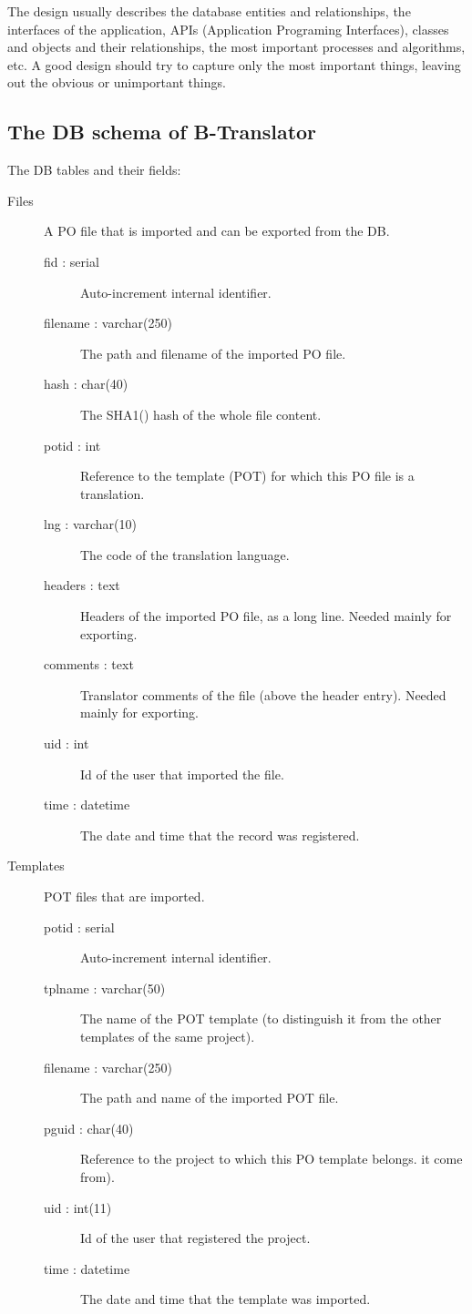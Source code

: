 \documentclass[11pt]{article}
\begin{document}
  The design usually describes the database entities and
  relationships, the interfaces of the application, APIs (Application
  Programing Interfaces), classes and objects and their relationships,
  the most important processes and algorithms, etc. A good design
  should try to capture only the most important things, leaving out
  the obvious or unimportant things.

\subsection{The DB schema of B-Translator}
\label{sec-5.1}


   The DB tables and their fields:

\begin{description}
\item [Files] A PO file that is imported and can be exported from the
              DB.

\begin{description}
\item [fid : serial] Auto-increment internal identifier.
\item [filename : varchar(250)] The path and filename of the
          imported PO file.
\item [hash : char(40)] The SHA1() hash of the whole file content.
\item [potid : int] Reference to the template (POT) for which this
          PO file is a translation.
\item [lng : varchar(10)] The code of the translation language.
\item [headers : text] Headers of the imported PO file, as a long
          line. Needed mainly for exporting.
\item [comments : text] Translator comments of the file (above the
          header entry). Needed mainly for exporting.
\item [uid : int] Id of the user that imported the file.
\item [time : datetime] The date and time that the record was
          registered.
\end{description}

\item [Templates] POT files that are imported.

\begin{description}
\item [potid : serial] Auto-increment internal identifier.
\item [tplname : varchar(50)] The name of the POT template (to
          distinguish it from the other templates of the same
          project).
\item [filename : varchar(250)] The path and name of the imported
          POT file.
\item [pguid : char(40)] Reference to the project to which this PO
          template belongs.  it come from).
\item [uid : int(11)] Id of the user that registered the project.
\item [time : datetime] The date and time that the template was
          imported.
\end{description}


\end{description}
\end{document}
